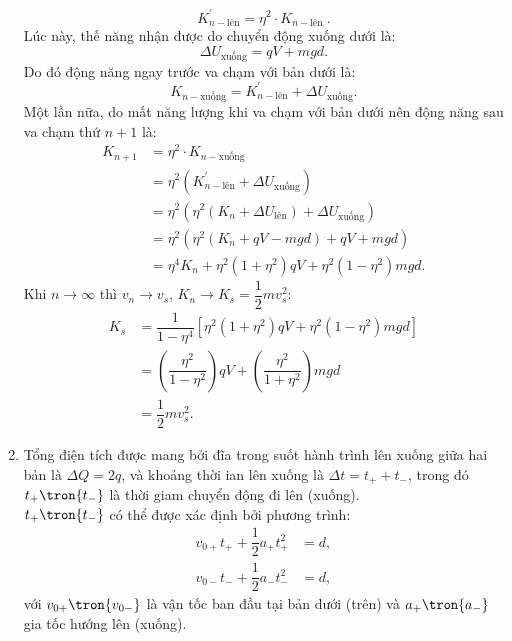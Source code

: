 \begin{loigiai}
\begin{enumerate}[1)]
    \[K_{n-\text {lên}}^{\prime}=\eta^{2} \cdot K_{n-\text {lên }}.\tag{d13}\label{q.8.d13}\]
    Lúc này, thế năng nhận được do chuyển động xuống dưới là:
    \[\Delta U_{\text {xuống}}=q V + m g d. \tag{d14}\label{q.8.d14}\]
    Do đó động năng ngay trước va chạm với bản dưới là:
    \[K_{n-\text {xuống}}=K_{n-\text {lên}}^{\prime}+\Delta U_{\text {xuống}}. \tag{d15}\label{q.8.d15}\]
    Một lần nữa, do mất năng lượng khi va chạm với bản dưới nên động năng sau va chạm thứ $n+1$ là:
    \[\begin{aligned}
    K_{n+1} &= \eta^{2} \cdot K_{n-\text {xuống}} \\
    &= \eta^{2}\left(K_{n-\text {lên}}^{\prime}+\Delta U_{\text {xuống}}\right) \\
    &= \eta^{2}\left(\eta^{2}\left(K_{n}+\Delta U_{\text {lên}}\right)+\Delta U_{\text {xuống}}\right) \\
    &= \eta^{2}\left(\eta^{2}\left(K_{n}+q V-m g d\right)+q V+m g d\right) \\
    &= \eta^{4} K_{n}+\eta^{2}\left(1+\eta^{2}\right) q V+\eta^{2}\left(1-\eta^{2}\right) m g d .
\end{aligned} \tag{d16}\label{q.8.d16}\]
    Khi $n \rightarrow \infty$ thì $v_n \rightarrow v_s$, $K_n \rightarrow K_s = \dfrac{1}{2}mv_s^2 $:
    \[\begin{aligned}
    K_{{s}} &= \dfrac{1}{1-\eta^{4}}\left[\eta^{2}\left(1+\eta^{2}\right) q V+\eta^{2}\left(1-\eta^{2}\right) m g d\right] \\
    &= \left(\dfrac{\eta^{2}}{1-\eta^{2}}\right) q V+\left(\dfrac{\eta^{2}}{1+\eta^{2}}\right) m g d \\
    &=\dfrac{1}{2} m {v}_{{s}}^{2}.
\end{aligned} \tag{d17}\label{q.8.d17}\]
    \item Tổng điện tích được mang bởi đĩa trong suốt hành trình lên xuống giữa hai bản là $\Delta Q = 2q$, và khoảng thời ian lên xuống là $\Delta t = t_+ + t_-$, trong đó $t_+ \tron{t_-}$ là thời giam chuyển động đi lên (xuống).\\
    $t_+ \tron{t_-}$ có thể được xác định bởi phương trình:
    \[\begin{aligned}
    v_{0+} t_+ + \dfrac{1}{2} a_+ t_+^2 &= d,\\
    v_{0-} t_- + \dfrac{1}{2} a_- t_-^2 &= d,
    \end{aligned} \tag{e1}\label{q.8.e1}\]
    với $v_{0+} \tron{v_{0-}}$ là vận tốc ban đầu tại bản dưới (trên) và $a_+ \tron{a_-}$ gia tốc hướng lên (xuống).\\

\end{enumerate}
\end{loigiai}
